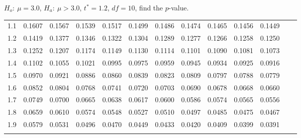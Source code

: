 \begin{frame}{\small $H_o:~\mu=3.0$, $H_a:~\mu>3.0$, $t^*=1.2$,
    $df=10$, find the $p$-value.}
{\begin{tabular}{l|llllllllllll}
 1.1 & 0.1607 & 0.1567 & 0.1539 & 0.1517 & 0.1499 & 0.1486 & 0.1474 & 0.1465 & 0.1456 & 0.1449  \\[5pt] \arrayrulecolor{light-gray}\hline\arrayrulecolor{black}  
\rowcolor{light-red} 1.2 & 0.1419 & 0.1377 & 0.1346 & 0.1322 & 0.1304 & 0.1289 & 0.1277 & 0.1266 & 0.1258 & 0.1250  \\[5pt] \arrayrulecolor{light-gray}\hline\arrayrulecolor{black}  
 1.3 & 0.1252 & 0.1207 & 0.1174 & 0.1149 & 0.1130 & 0.1114 & 0.1101 & 0.1090 & 0.1081 & 0.1073  \\[5pt] \arrayrulecolor{light-gray}\hline\arrayrulecolor{black}  
 1.4 & 0.1102 & 0.1055 & 0.1021 & 0.0995 & 0.0975 & 0.0959 & 0.0945 & 0.0934 & 0.0925 & 0.0916  \\[5pt] \arrayrulecolor{light-gray}\hline\arrayrulecolor{black}  
 1.5 & 0.0970 & 0.0921 & 0.0886 & 0.0860 & 0.0839 & 0.0823 & 0.0809 & 0.0797 & 0.0788 & 0.0779  \\[5pt] \arrayrulecolor{light-gray}\hline\arrayrulecolor{black}  
 1.6 & 0.0852 & 0.0804 & 0.0768 & 0.0741 & 0.0720 & 0.0703 & 0.0690 & 0.0678 & 0.0668 & 0.0660  \\[5pt] \arrayrulecolor{light-gray}\hline\arrayrulecolor{black}  
 1.7 & 0.0749 & 0.0700 & 0.0665 & 0.0638 & 0.0617 & 0.0600 & 0.0586 & 0.0574 & 0.0565 & 0.0556  \\[5pt] \arrayrulecolor{light-gray}\hline\arrayrulecolor{black}  
 1.8 & 0.0659 & 0.0610 & 0.0574 & 0.0548 & 0.0527 & 0.0510 & 0.0497 & 0.0485 & 0.0475 & 0.0467  \\[5pt] \arrayrulecolor{light-gray}\hline\arrayrulecolor{black}  
 1.9 & 0.0579 & 0.0531 & 0.0496 & 0.0470 & 0.0449 & 0.0433 & 0.0420 & 0.0409 & 0.0399 & 0.0391  \\[5pt] \arrayrulecolor{light-gray}\hline\arrayrulecolor{black}  
\end{tabular}

}

\end{frame}


